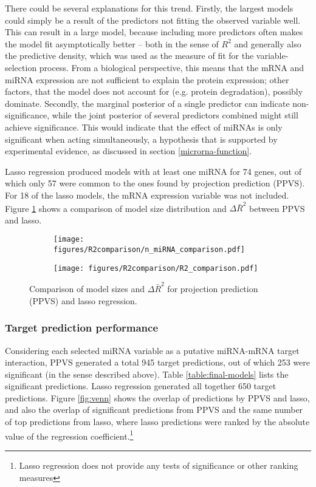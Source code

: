 There could be several explanations for this trend. Firstly, the largest
models could simply be a result of the predictors not fitting the observed
variable well. This can result in a large model, because including more
predictors often makes the model fit asymptotically better -- both in the
sense of $R^2$ and generally also the predictive density, which was used as
the measure of fit for the variable-selection process. From a biological
perspective, this means that the mRNA and miRNA expression are not sufficient
to explain the protein expression; other factors, that the model does not
account for (e.g. protein degradation), possibly dominate.
Secondly, the marginal posterior of a single predictor can indicate
non-significance, while the joint posterior of several predictors combined
might still achieve significance. This would indicate that the effect of
miRNAs is only significant when acting simultaneously, a hypothesis that is
supported by experimental evidence, as discussed in section
\ref{microrna-function}.

Lasso regression produced models with at least one miRNA for 74 genes, out of
which only 57 were common to the ones found by projection prediction (PPVS).
For 18 of the lasso models, the mRNA expression variable was not included.
Figure \ref{fig:model-size} shows a comparison of model size distribution
and $\Delta\bar{R}^2$ between PPVS and lasso.

\begin{figure}[!h]
  \centering
  \begin{subfigure}{.45\textwidth}
    \centering
    \texttt{[image: figures/R2comparison/n\_miRNA\_comparison.pdf]}
  \end{subfigure}
  \begin{subfigure}{.45\textwidth}
    \centering
    \texttt{[image: figures/R2comparison/R2\_comparison.pdf]}
  \end{subfigure}

  \caption{Comparison of model sizes and $\Delta\bar{R}^2$ for
      projection prediction (PPVS) and lasso regression.}
  \label{fig:model-size}
\end{figure}




\subsubsection{Target prediction performance}

Considering each selected miRNA variable as a putative miRNA-mRNA target
interaction, PPVS generated a total 945 target predictions, out of which
253 were significant (in the sense described above). Table \ref{table:final-models}
lists the significant predictions.
Lasso regression generated all together 650 target predictions. Figure
\ref{fig:venn} shows the overlap of predictions by PPVS and lasso, and also
the overlap of significant predictions from PPVS and the same number of top
predictions from lasso, where lasso predictions were ranked by the absolute value of
the regression coefficient.\footnote{Lasso regression does not provide any tests of
significance or other ranking measures}

